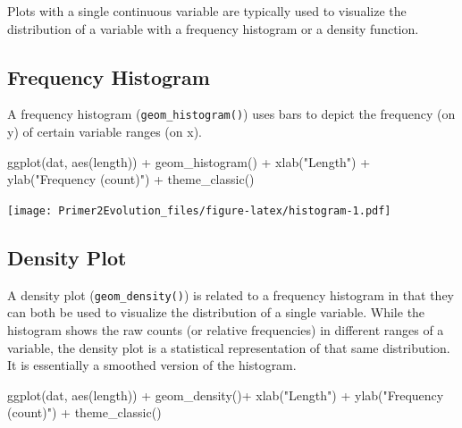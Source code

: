 \documentclass[
]{book}
\newenvironment{Shaded}{\begin{snugshade}}{\end{snugshade}}
\newcommand{\FunctionTok}[1]{\textcolor[rgb]{0.00,0.00,0.00}{#1}}
\newcommand{\NormalTok}[1]{#1}
\newcommand{\SpecialCharTok}[1]{\textcolor[rgb]{0.00,0.00,0.00}{#1}}
\newcommand{\StringTok}[1]{\textcolor[rgb]{0.31,0.60,0.02}{#1}}
\begin{document}
Plots with a single continuous variable are typically used to visualize the distribution of a variable with a frequency histogram or a density function.

\hypertarget{frequency-histogram}{%
\subsection{Frequency Histogram}\label{frequency-histogram}}

A frequency histogram (\texttt{geom\_histogram()}) uses bars to depict the frequency (on y) of certain variable ranges (on x).

\begin{Shaded}
\begin{Highlighting}[]
\FunctionTok{ggplot}\NormalTok{(dat, }\FunctionTok{aes}\NormalTok{(length)) }\SpecialCharTok{+}
    \FunctionTok{geom\_histogram}\NormalTok{() }\SpecialCharTok{+}
    \FunctionTok{xlab}\NormalTok{(}\StringTok{"Length"}\NormalTok{) }\SpecialCharTok{+}
    \FunctionTok{ylab}\NormalTok{(}\StringTok{"Frequency (count)"}\NormalTok{) }\SpecialCharTok{+}
    \FunctionTok{theme\_classic}\NormalTok{()}
\end{Highlighting}
\end{Shaded}

\texttt{[image: Primer2Evolution\_files/figure-latex/histogram-1.pdf]}

\hypertarget{density-plot}{%
\subsection{Density Plot}\label{density-plot}}

A density plot (\texttt{geom\_density()}) is related to a frequency histogram in that they can both be used to visualize the distribution of a single variable. While the histogram shows the raw counts (or relative frequencies) in different ranges of a variable, the density plot is a statistical representation of that same distribution. It is essentially a smoothed version of the histogram.

\begin{Shaded}
\begin{Highlighting}[]
\FunctionTok{ggplot}\NormalTok{(dat, }\FunctionTok{aes}\NormalTok{(length)) }\SpecialCharTok{+}
    \FunctionTok{geom\_density}\NormalTok{()}\SpecialCharTok{+}
    \FunctionTok{xlab}\NormalTok{(}\StringTok{"Length"}\NormalTok{) }\SpecialCharTok{+}
    \FunctionTok{ylab}\NormalTok{(}\StringTok{"Frequency (count)"}\NormalTok{) }\SpecialCharTok{+}
    \FunctionTok{theme\_classic}\NormalTok{()}
\end{Highlighting}
\end{Shaded}
\end{document}
